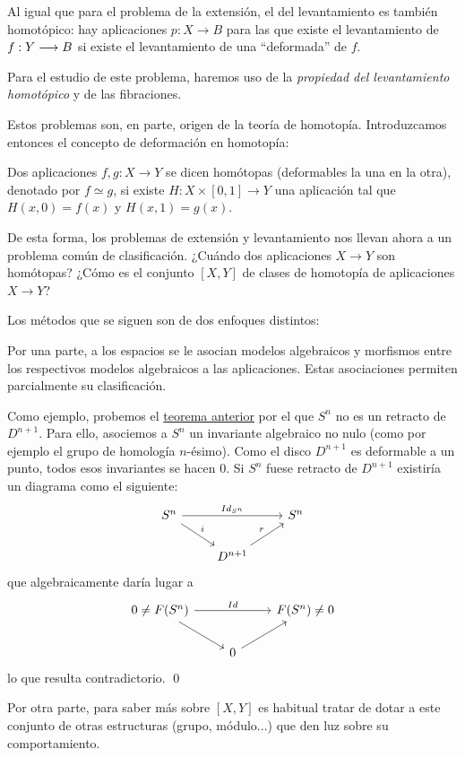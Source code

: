 Al igual que para el problema de la extensión, el del levantamiento es también homotópico: hay aplicaciones $p : X \longrightarrow B$ para las que existe el levantamiento de $f : \nobreak Y \longrightarrow B$ si existe el levantamiento de una ``deformada'' de $f$. \par

Para el estudio de este problema, haremos uso de la \textit{propiedad del levantamiento homotópico} y de las fibraciones. 

%

Estos problemas son, en parte, origen de la teoría de homotopía. Introduzcamos entonces el concepto de deformación en homotopía:
\begin{defin}
Dos aplicaciones $f, g : X \longrightarrow Y$ se dicen homótopas (deformables la una en la otra), denotado por $f \simeq g$, si existe  $H : X \times [0,1] \longrightarrow Y$ una aplicación tal que $H(x ,0) = f(x)$ y $H(x, 1) = g(x)$.
\end{defin}

De esta forma, los problemas de extensión y levantamiento nos llevan ahora a un problema común de clasificación. ¿Cuándo dos aplicaciones $X \longrightarrow Y$ son homótopas? ¿Cómo es el conjunto $[X, Y]$ de clases de homotopía de aplicaciones $X \longrightarrow Y$? \par 
Los métodos que se siguen son de dos enfoques distintos:\par 
Por una parte, a los espacios se le asocian modelos algebraicos y morfismos entre los respectivos modelos algebraicos a las aplicaciones. Estas asociaciones permiten parcialmente su clasificación. \par 
Como ejemplo, probemos el \hyperlink{c1t:retractoh}{teorema anterior} por el que $S^n$ no es un retracto de $D^{n+1}$. Para ello, asociemos a $S^n$ un invariante algebraico no nulo (como por ejemplo el grupo de homología $n$-ésimo). Como el disco $D^{n+1}$ es deformable a un punto, todos esos invariantes se hacen 0. Si $S^n$ fuese retracto de $D^{n+1}$ existiría un diagrama como el siguiente:
$$
\begin{tikzcd}
	S^n \arrow{rr}{Id_{S^n}} \drar{i} & & S^n \\
		&	D^{n+1} \urar{r} & 
\end{tikzcd}
$$
que algebraicamente daría lugar a 
$$
\begin{tikzcd}
	0 \neq F(S^n) \arrow{rr}{Id} \drar & &  F(S^n) \neq 0 \\
		&	0 \urar & 
\end{tikzcd}
$$
lo que resulta contradictorio. \qed \par

Por otra parte, para saber más sobre $[X, Y]$ es habitual tratar de dotar a este conjunto de otras estructuras (grupo, módulo...) que den luz sobre su comportamiento. \par